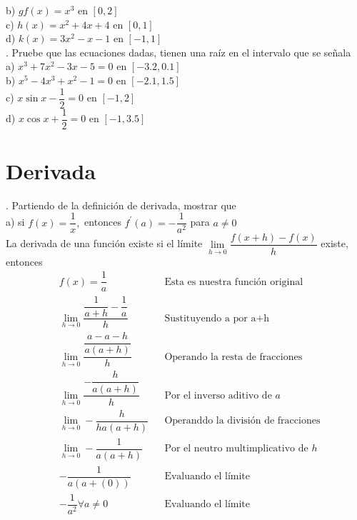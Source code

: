 \documentclass[letterpaper]{article}
\newcommand{\fp}[1]{#1^{\prime}}
\begin{document}

b) $gf(x) = x^{3} \text{  en  } [0,2] $\\


c) $ h(x) = x^{2}+4x+4 \text{  en  } [0,1] $\\


d) $ k(x) = 3x^{2} - x -1 \text{  en  } [-1,1] $\\


. Pruebe que las ecuaciones dadas, tienen una raíz en el intervalo que se señala\\

a) $ x^{3} + 7x^{2} -3x -5 = 0$ en $ [-3.2, 0.1] $\\


b) $ x^{5} - 4x^{3} +x^{2} -1 = 0$ en $ [-2.1, 1.5] $\\


c) $ x\sin x - \dfrac{1}{2} = 0$ en $ [-1, 2] $\\


d) $ x\cos x + \dfrac{1}{2} = 0$ en $ [-1,3.5] $\\


\section*{Derivada}

. Partiendo de la definición de derivada, mostrar que\\

a) si $ f(x) = \dfrac{1}{x}, $ entonces $ \fp{f}(a) = - \dfrac{1}{a^{2}}$ para $ a \neq 0 $\\

La derivada de una función existe si el límite $ \lim\limits_{h \to 0} \dfrac{f(x+h)-f(x)}{h} $ existe, entonces 
\begin{align*}
	& f(x) = \dfrac{1}{a} &&\text{Esta es nuestra función original}\\
	&\lim\limits_{h \to 0} \dfrac{\dfrac{1}{a+h}-\dfrac{1}{a}}{h} &&\text{Sustituyendo a por a+h}\\
	&\lim\limits_{h \to 0} \dfrac{\dfrac{a-a-h}{a(a+h)}}{h} &&\text{Operando la resta de fracciones}\\
	&\lim\limits_{h \to 0} \dfrac{-\dfrac{h}{a(a+h)}}{h} &&\text{Por el inverso aditivo de }a\\
	&\lim\limits_{h \to 0} -\dfrac{h}{ha(a+h)} &&\text{Operanddo la división de fracciones}\\
	&\lim\limits_{h \to 0} -\dfrac{1}{a(a+h)} &&\text{Por el neutro multimplicativo de }h\\
	&-\dfrac{1}{a(a+(0))} &&\text{Evaluando el límite}\\
	&-\dfrac{1}{a^{2}} \forall a \ne 0 &&\text{Evaluando el límite}\\
\end{align*}
\end{document}
